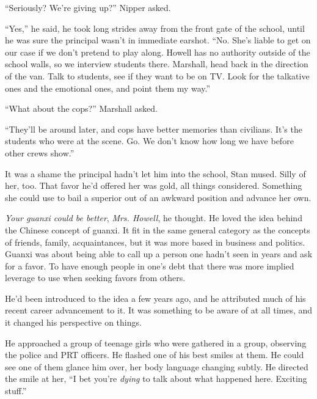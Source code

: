``Seriously?  We're giving up?'' Nipper asked.



``Yes,'' he said, he took long strides away from the front gate of the school, until he was sure the principal wasn't in immediate earshot.  ``No.  She's liable to get on our case if we don't pretend to play along.  Howell has no authority outside of the school walls, so we interview students there.  Marshall, head back in the direction of the van.  Talk to students, see if they want to be on TV.  Look for the talkative ones and the emotional ones, and point them my way.''



``What about the cops?'' Marshall asked.



``They'll be around later, and cops have better memories than civilians.  It's the students who were at the scene.  Go.  We don't know how long we have before other crews show.''



It was a shame the principal hadn't let him into the school, Stan mused.  Silly of her, too.  That favor he'd offered her was gold, all things considered.  Something she could use to bail a superior out of an awkward position and advance her own.



\emph{Your guanxi could be better}, \emph{Mrs. Howell}, he thought.  He loved the idea behind the Chinese concept of guanxi.  It fit in the same general category as the concepts of friends, family, acquaintances, but it was more based in business and politics.  Guanxi was about being able to call up a person one hadn't seen in years and ask for a favor.  To have enough people in one's debt that there was more implied leverage to use when seeking favors from others.



He'd been introduced to the idea a few years ago, and he attributed much of his recent career advancement to it.  It was something to be aware of at all times, and it changed his perspective on things.



He approached a group of teenage girls who were gathered in a group, observing the police and PRT officers.  He flashed one of his best smiles at them.  He could see one of them glance him over, her body language changing subtly.  He directed the smile at her, ``I bet you're \emph{dying} to talk about what happened here.  Exciting stuff.''



